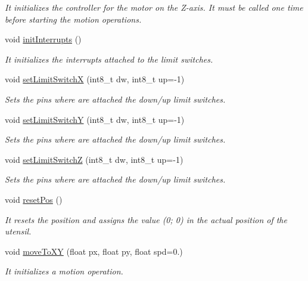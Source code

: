 \begin{DoxyCompactItemize}
\begin{DoxyCompactList}\small\item\em It initializes the controller for the motor on the Z-\/axis. It must be called one time before starting the motion operations. \end{DoxyCompactList}\item 
void \hyperlink{class_c_n_c___router_accb65341d2a2c3c18615922cf7288997}{init\+Interrupts} ()
\begin{DoxyCompactList}\small\item\em It initializes the interrupts attached to the limit switches. \end{DoxyCompactList}\item 
void \hyperlink{class_c_n_c___router_a0d1313b481b864a85758aaeab61e6595}{set\+Limit\+Switch\+X} (int8\+\_\+t dw, int8\+\_\+t up=-\/1)
\begin{DoxyCompactList}\small\item\em Sets the pins where are attached the down/up limit switches. \end{DoxyCompactList}\item 
void \hyperlink{class_c_n_c___router_af9308de7c3273a4f7dc18bc3cfe617d4}{set\+Limit\+Switch\+Y} (int8\+\_\+t dw, int8\+\_\+t up=-\/1)
\begin{DoxyCompactList}\small\item\em Sets the pins where are attached the down/up limit switches. \end{DoxyCompactList}\item 
void \hyperlink{class_c_n_c___router_ac993b5ad9929da6f83bb8783fafafa1a}{set\+Limit\+Switch\+Z} (int8\+\_\+t dw, int8\+\_\+t up=-\/1)
\begin{DoxyCompactList}\small\item\em Sets the pins where are attached the down/up limit switches. \end{DoxyCompactList}\item 
void \hyperlink{class_c_n_c___router_a30d838430b7452a8f47071d2f6b8845e}{reset\+Pos} ()
\begin{DoxyCompactList}\small\item\em It resets the position and assigns the value (0; 0) in the actual position of the utensil. \end{DoxyCompactList}\item 
void \hyperlink{class_c_n_c___router_a3aedfc767d93e8cb59f10322067ffdae}{move\+To\+X\+Y} (float px, float py, float spd=0.)
\begin{DoxyCompactList}\small\item\em It initializes a motion operation. \end{DoxyCompactList}\item 

\end{DoxyCompactItemize}
